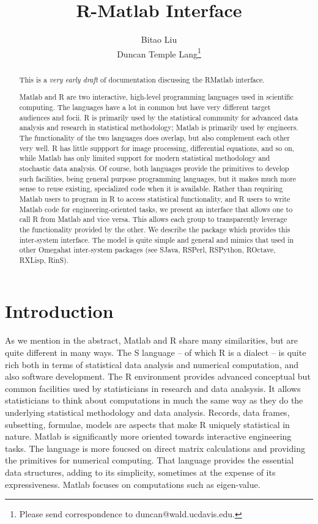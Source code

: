 \documentclass{article}
\title{R-Matlab Interface}
\author{Bitao Liu\\
Duncan Temple Lang\footnote{Please send correspondence 
to duncan@wald.ucdavis.edu.}
}
\begin{document}
\maketitle

\begin{abstract}
This is a \textit{very early draft} of documentation discussing
the RMatlab interface.


  Matlab and R are two interactive, high-level programming languages
  used in scientific computing.  The languages have a lot in common
  but have very different target audiences and focii.
  R  is primarily used by the statistical community for advanced data analysis
  and research in statistical methodology; Matlab is primarily used  
  by engineers. The functionality of the two languages does overlap,
  but also complement each other very well. R has little suppport for
  image processing, differential equations, and so on,
  while Matlab has only limited support for modern statistical
  methodology and stochastic data analysis. Of course, both languages provide the primitives 
  to develop such facilities, being general purpose programming
  languages, but it makes much more sense to reuse existing,
  specialized code when it is available. Rather than requiring 
  Matlab users to program in R to access statistical functionality,
  and R users to write Matlab code for engineering-oriented tasks, 
  we present an interface that allows one to call R from Matlab and
  vice versa.
  This allows each group 
  to transparently leverage the functionality provided by the other.
  We describe the  package which provides this inter-system
  interface. The model is quite simple and general and mimics that
  used in other Omegahat inter-system packages (see SJava, RSPerl, 
   RSPython, ROctave, RXLisp, RinS). 
\end{abstract}


\section{Introduction}
As we mention in the abstract, Matlab and R share many similarities,
but are quite different in many ways.  The S language -- of which R is
a dialect -- is quite rich both in terms of statistical data analysis
and numerical computation, and also software development.  The R
environment provides advanced conceptual but common facilities used by
statisticians in research and data analsysis.  It allows statisticians
to think about computations in much the same way as they do the
underlying statistical methodology and data analysis. Records, data
frames, subsetting, formulae, models are aspects that make R uniquely
statistical in nature.  Matlab is significantly more oriented towards
interactive engineering tasks. The language is more foucsed on direct
matrix calculations and providing the primitives for numerical
computing.  That language provides the essential data structures,
adding to its simplicity, sometimes at the expense of its
expressiveness.  Matlab focuses on computations
such as eigen-value.
\end{document}
